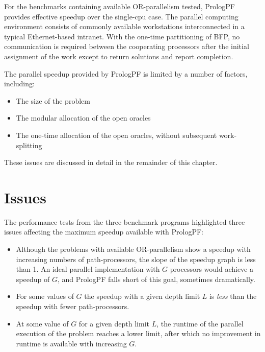 For the benchmarks containing available OR-parallelism tested, PrologPF provides
effective speedup over the single-cpu case.  The parallel computing environment
consists of commonly available workstations interconnected in a typical Ethernet-based
intranet.  With the one-time partitioning of BFP, 
no communication is required between the cooperating processors after the
initial assignment of the work except to return solutions and report completion.

The parallel speedup provided by PrologPF is limited by a number of factors, including:
\begin{itemize}
\item{The size of the problem}
\item{The modular allocation of the open oracles}
\item{The one-time allocation of the open oracles, without subsequent work-splitting}
\end{itemize}

These issues are discussed in detail in the remainder of this chapter.

\section{Issues} %
\label{bfp_issues}

The performance tests from the three benchmark programs highlighted three issues
affecting the maximum speedup available with PrologPF:
\begin{itemize}
\item{Although the problems with available OR-parallelism show a speedup with increasing
  numbers of path-processors, the slope of the speedup graph is less than 1.  An ideal
  parallel implementation with $G$ processors would achieve a speedup of $G$, and
  PrologPF falls short of this goal, sometimes dramatically.}
\item{For some values of $G$ the speedup with a given depth limit $L$ is \textit{less} than
  the speedup with fewer path-processors.}
\item{At some value of $G$ for a given depth limit $L$, the runtime of the parallel
  execution of the problem reaches a lower limit, after which no improvement in runtime
  is available with increasing $G$.}
\end{itemize}

